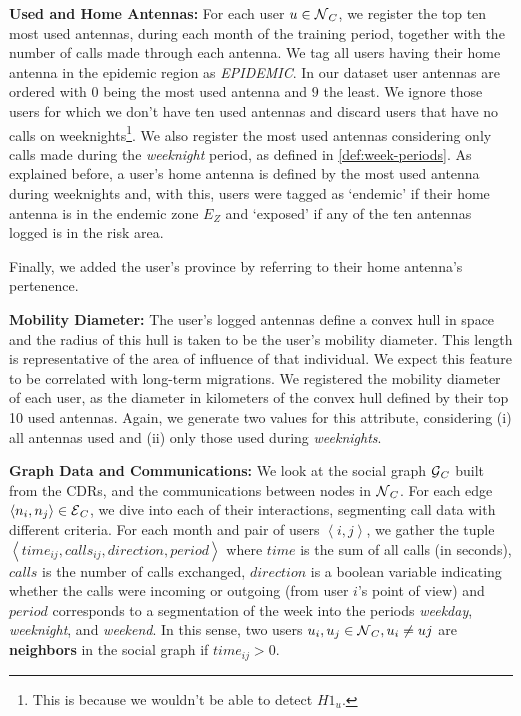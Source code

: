 \begin{enumerate*}[label={\alph*)},]
\item \textbf{Used and Home Antennas:} For each user $u \in \operatorname{\mathcal{N}}_C$, we register the top ten most used antennas, during each month of the training period,
together with the number of calls made through each antenna.
We tag all users having their home antenna in the epidemic region as \textit{EPIDEMIC}.
In our dataset user antennas are ordered with $0$ being the most used antenna and $9$ the least.
We ignore those users for which we don't have ten used antennas and discard users that have no calls on weeknights\footnote{This is because we wouldn't be able to detect $H1_u$.}.
We also register the most used antennas considering only calls made during the \textit{weeknight} period, as defined in \cref{def:week-periods}.
As explained before, a user's home antenna is defined by the most used antenna during weeknights and, with this, users were tagged as `endemic' if their home antenna is in the endemic zone $E_Z$ and `exposed' if any of the ten antennas logged is in the risk area.

Finally, we added the user's province by referring to their home antenna's pertenence.
\item \textbf{Mobility Diameter:} The user's logged antennas define a convex hull in space and the radius of this hull is taken to be the user's mobility diameter.
This length is representative of the area of influence of that individual.
We expect this feature to be correlated with long-term migrations.
We registered the mobility diameter of each user, as the diameter in kilometers of the convex hull defined by their top 10 used antennas.
Again, we generate two values for this attribute, considering (i) all antennas used and (ii) only those used during \textit{weeknights}.
\item \textbf{Graph Data and Communications:} We look at the social graph $\operatorname{\mathcal{G}}_C$ built from the CDRs, and the communications between nodes in $\operatorname{\mathcal{N}}_C$.
For each edge $\left< n_i, n_j \right> \in \operatorname{\mathcal{E}}_C$, we dive into each of their interactions, segmenting call data with different criteria.
For each month and pair of users $\left< i,j \right>$, we gather the tuple $\left< time_{ij}, calls_{ij}, direction, period \right>$ where $time$ is the sum of all calls (in seconds), $calls$ is the number of calls exchanged, $direction$ is a boolean variable indicating whether the calls were incoming or outgoing (from user $i$'s point of view) and $period$ corresponds to a segmentation of the week into the periods \textit{weekday}, \textit{weeknight}, and \textit{weekend}.
In this sense, two users $u_i, u_j \in \operatorname{\mathcal{N}}_C, u_i \neq uj$ are \textbf{neighbors} in the social graph if $time_{ij} > 0$.
\end{enumerate*}

